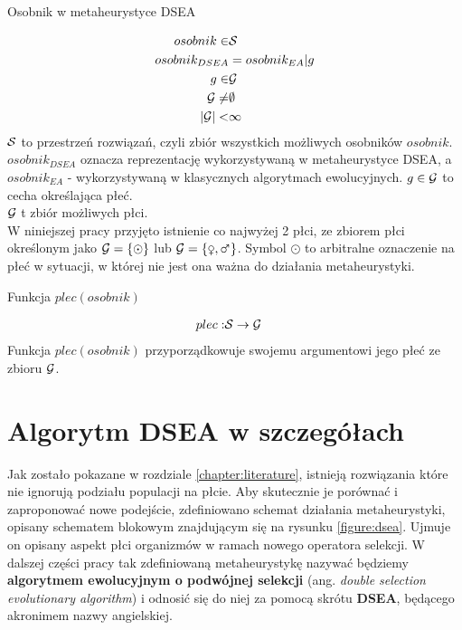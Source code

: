 \documentclass[./FM_mgr.tex]{subfiles}
\begin{document}
\begin{signature}
	\caption{Osobnik w metaheurystyce DSEA \label{signature:specimen_dsea}}
	\begin{align}
		osobnik  \in &\mathcal{S} \\
		osobnik_{DSEA} &= osobnik_{EA} | g \\
		g \in &\mathcal{G} \\
		\mathcal{G} \neq & \emptyset \\
		|\mathcal{G}| < &\infty
	\end{align}	
	$\mathcal{S}$ to przestrzeń rozwiązań, czyli zbiór wszystkich możliwych osobników $osobnik$.
	$osobnik_{DSEA}$ oznacza reprezentację wykorzystywaną w metaheurystyce DSEA, a $osobnik_{EA}$ - wykorzystywaną w klasycznych algorytmach ewolucyjnych. $g \in \mathcal{G}$ to cecha określająca płeć. \\
	$\mathcal{G}$ t zbiór możliwych płci.\\
	W niniejszej pracy przyjęto istnienie co najwyżej 2 płci, ze zbiorem płci określonym jako $\mathcal{G} = \{ \odot \}$ lub $\important{G} = \{ \female, \male \}$. Symbol $\odot$ to arbitralne oznaczenie na płeć w sytuacji, w której nie jest ona ważna do działania metaheurystyki.
\end{signature}

\begin{signature}
	\caption{Funkcja $plec(osobnik)$ \label{signature:genderFoo}}
	\begin{align}
	plec: & \mathcal{S} \rightarrow \mathcal{G}
	\end{align}
	Funkcja $plec(osobnik)$ przyporządkowuje swojemu argumentowi jego płeć ze zbioru $\mathcal{G}$.
\end{signature}

\newpage

\section{Algorytm DSEA w szczegółach} \label{section:dsea}

Jak zostało pokazane w rozdziale \ref{chapter:literature}, istnieją rozwiązania które nie ignorują podziału populacji na płcie. 
Aby skutecznie je porównać i zaproponować nowe podejście, zdefiniowano schemat działania metaheurystyki, opisany schematem blokowym znajdującym się na rysunku \ref{figure:dsea}. Ujmuje on opisany aspekt płci organizmów w ramach nowego operatora selekcji. 
W dalszej części pracy tak zdefiniowaną metaheurystykę nazywać będziemy \textbf{algorytmem ewolucyjnym o podwójnej selekcji} (ang. \emph{double selection evolutionary algorithm}) i odnosić się do niej za pomocą skrótu \textbf{DSEA}, będącego akronimem nazwy angielskiej.
\end{document}
